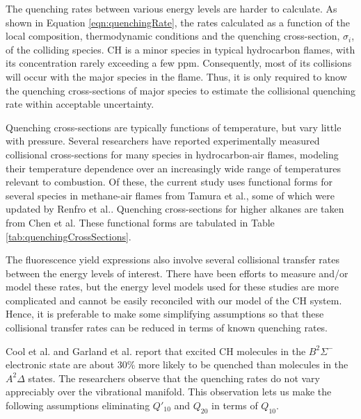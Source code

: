 

The quenching rates between various energy levels are harder to calculate.
As shown in Equation \ref{eqn:quenchingRate}, the rates calculated as a function of the local composition, thermodynamic conditions and the quenching cross-section, \(\sigma_i\), of the colliding species.
CH is a minor species in typical hydrocarbon flames, with its concentration rarely exceeding a few ppm.
Consequently, most of its collisions will occur with the major species in the flame.
Thus, it is only required to know the quenching cross-sections of major species to estimate the collisional quenching rate within acceptable uncertainty.

Quenching cross-sections are typically functions of temperature, but vary little with pressure.
Several researchers have reported experimentally measured collisional cross-sections for many species in hydrocarbon-air flames, modeling their temperature dependence over an increasingly wide range of temperatures\cite{1983-nokes,1983-tabares,1984-cool,1984-nokes,1985-garland-a,1985-garland-b,1986-garland,1987-garland,1988-heinrich,1988-rensberger,1991-heard,1991-kenner,1992-chen,1992-cooper,1993-chen,1994-chen,1995-heinrich,1998-chen,1998-tamura,2000-cerezo,2000-luque,2002-renfro} relevant to combustion.
Of these, the current study uses functional forms for several species in methane-air flames from Tamura et al.\cite{1998-tamura}, some of which were updated by Renfro et al.\cite{2002-renfro}.
Quenching cross-sections for higher alkanes are taken from Chen et al.\cite{1992-chen,1993-chen,1994-chen}
These functional forms are tabulated in Table \ref{tab:quenchingCrossSections}.



The fluorescence yield expressions also involve several collisional transfer rates between the energy levels of interest.
There have been efforts\cite{2000-randall,2005-richmond} to measure and/or model these rates, but the energy level models used for these studies are more complicated and cannot be easily reconciled with our model of the CH system.
Hence, it is preferable to make some simplifying assumptions so that these collisional transfer rates can be reduced in terms of known quenching rates.

Cool et al.\cite{1984-cool} and Garland et al.\cite{1985-garland-b} report that excited CH molecules in the \(B^2\Sigma^-\) electronic state are about 30\% more likely to be quenched than molecules in the \(A^2\Delta\) states.
The researchers observe that the quenching rates do not vary appreciably over the vibrational manifold.
This observation lets us make the following assumptions eliminating \(Q'_{10}\) and \(Q_{20}\) in terms of \(Q_{10}\).

